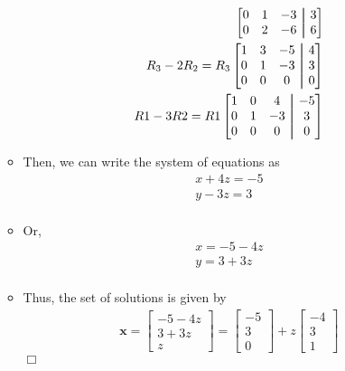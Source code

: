 \documentclass[11pt]{article}
\newcommand{\aug}{\fboxsep=-\fboxrule\!\!\!\fbox{\strut}\!\!\!}
\begin{document}
\begin{enumerate}
\begin{itemize}
\begin{align*}
\begin{bmatrix}
      0 & 1 & -3 &\aug& 3 \\
      0 & 2 & -6&\aug& 6 \\
      \end{bmatrix}\\
      R_3 - 2R_2 = R_3
      \begin{bmatrix}
      1 & 3 & -5 &\aug& 4 \\
      0 & 1 & -3 &\aug& 3 \\
      0 & 0 & 0&\aug& 0 \\
      \end{bmatrix}\\
      R1 - 3R2 = R1
      \begin{bmatrix}
      1 & 0 & 4 &\aug& -5 \\
      0 & 1 & -3 &\aug& 3 \\
      0 & 0 & 0&\aug& 0 \\
    \end{bmatrix}
    \end{align*}
  \item[] Then, we can write the system of equations as \begin{align*}
    x + 4z = -5 \\
    y - 3z = 3 \\
  \end{align*}
\item[] Or, \begin{align*}
    x = -5 - 4z \\
    y = 3 + 3z \\
  \end{align*}
  \item[] Thus, the set of solutions is given by \begin{align*}
      \mathbf{x} = \begin{bmatrix}
        -5 - 4z \\
        3 + 3z \\
        z
        \end{bmatrix} = \begin{bmatrix}
        -5 \\
        3 \\
        0
      \end{bmatrix} + z \begin{bmatrix}
        -4 \\
        3 \\
        1
      \end{bmatrix}
    \end{align*}
 $\Box$
  \end{itemize}


\end{enumerate}
\end{document}
